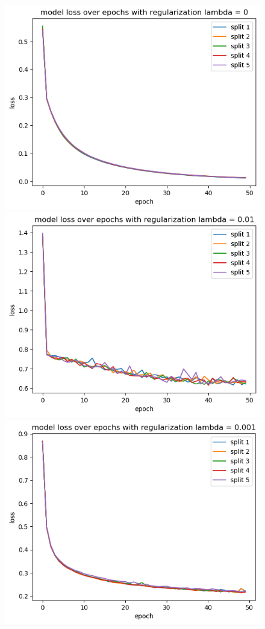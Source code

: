 \documentclass[12pt]{article}
\begin{document}
\begin{figure}[ht]
    \centering
   \includegraphics[scale=0.5]{graphics/loss_over_epochs_exercise_e_0.png}
  \includegraphics[scale=0.5]{graphics/loss_over_epochs_exercise_e_01.png}
    \includegraphics[scale=0.5]{graphics/loss_over_epochs_exercise_e_001.png}

\end{figure}
\end{document}
